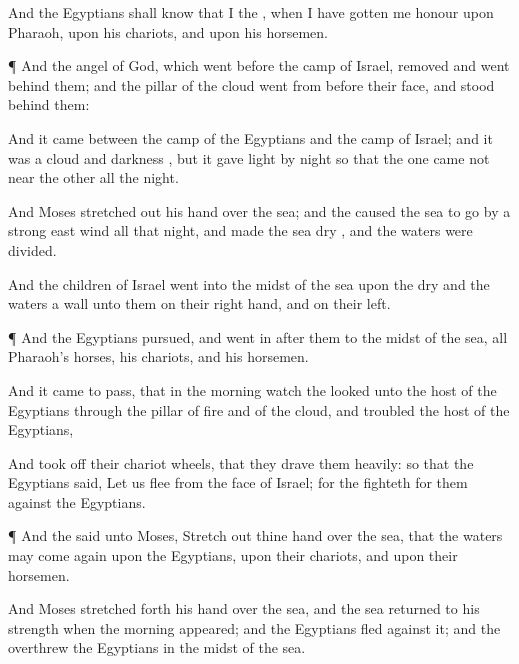 {And the
Egyptians shall
know that I
{} the
{}, when I have gotten me
honour upon
Pharaoh, upon his
chariots, and upon his
horsemen.


\par }{\PP {}¶ And the
angel of
God, which
went
before the
camp of
Israel,
removed and
went
behind them; and the
pillar of the
cloud
went from before their
face, and
stood
behind them:

And it
came between the
camp of the
Egyptians and the
camp of
Israel; and it was a
cloud and
darkness
{}, but it gave
light by
night
{} so that the one came not
near the
other all the
night.


\par }{\PP {}And
Moses stretched
out his
hand over the
sea; and the
{} caused the
sea to
go
{} by a
strong
east
wind all that
night, and
made the
sea
dry
{}, and the
waters were
divided.

And the
children of
Israel
went into the
midst of the
sea upon the
dry
{} and the
waters
{} a
wall unto them on their right
hand, and on their
left.


\par }{\PP {}¶ And the
Egyptians
pursued, and went
in
after them to the
midst of the
sea,
{} all
Pharaoh’s
horses, his
chariots, and his
horsemen.

And it came to pass, that in the
morning
watch the
{}
looked unto the
host of the
Egyptians through the
pillar of
fire and of the
cloud, and
troubled the
host of the
Egyptians,

And took
off their
chariot
wheels, that they
drave them
heavily: so that the
Egyptians
said, Let us
flee from the
face of
Israel; for the
{}
fighteth for them against the
Egyptians.


\par }{\PP {}¶ And the
{}
said unto
Moses, Stretch
out thine
hand over the
sea, that the
waters may come
again upon the
Egyptians, upon their
chariots, and upon their
horsemen.

And
Moses stretched
forth his
hand over the
sea, and the
sea
returned to his
strength when the
morning
appeared; and the
Egyptians
fled
against it; and the
{}
overthrew the
Egyptians in the
midst of the
sea.

}

